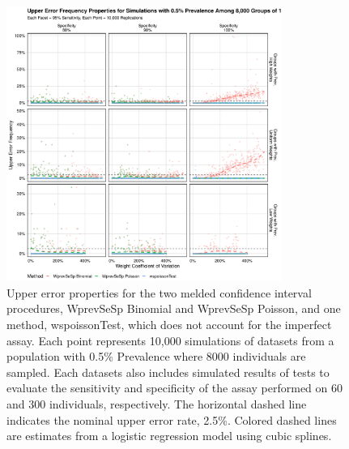 \documentclass[AMA,STIX1COL]{WileyNJD-v2}
\begin{document}
\begin{figure}
\centering
\includegraphics[width=0.8\textwidth]{figures/imperfect_upper_error_frequency_8000_groups_0_005_prev.pdf}
\caption{Upper error properties for the two melded confidence interval procedures, WprevSeSp Binomial and WprevSeSp Poisson, and one method, wspoissonTest, which does not account for the imperfect assay.
Each point represents 10,000 simulations of datasets from a population with 0.5\% Prevalence where 8000 individuals are sampled.
Each datasets also includes simulated results of tests to evaluate the sensitivity and specificity of the assay performed on 60 and 300 individuals, respectively.
The horizontal dashed line indicates the nominal upper error rate, 2.5\%.
Colored dashed lines are estimates from a logistic regression model using cubic splines.}
\label{fig:imperfect_upper_error_frequency_8000_groups_0_005_prev}
\end{figure}
\end{document}
